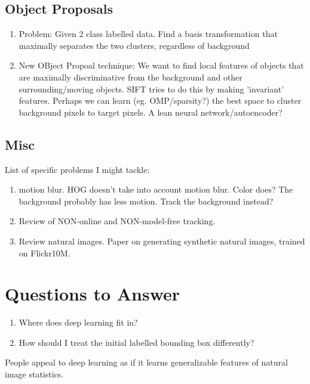 \subsection{Object Proposals}
\begin{enumerate}
\item Problem: Given 2 class labelled data. Find a basis transformation that maximally separates the two clusters, regardless of background
\item New OBject Propoal technique: We want to find local features of objects that are maximally discriminative from the background and other surrounding/moving objects. SIFT tries to do this by making 'invariant' features. Perhaps we can learn (eg. OMP/sparsity?) the best space to cluster background pixels to target pixels. A lean neural network/autoencoder?
\end{enumerate}


\subsection{Misc}
List of specific problems I might tackle:
\begin{enumerate}
\item motion blur. HOG doesn't take into account motion blur. Color does? The background probably has less motion. Track the background instead?
\item Review of NON-online and NON-model-free tracking.
\item Review natural images. Paper on generating synthetic natural images, trained on Flickr10M.
\end{enumerate}

\section{Questions to Answer}
\begin{enumerate}
\item Where does deep learning fit in?
\item How should I treat the initial labelled bounding box differently?
\end{enumerate}

People appeal to deep learning as if it learns generalizable features of natural image statistics.

